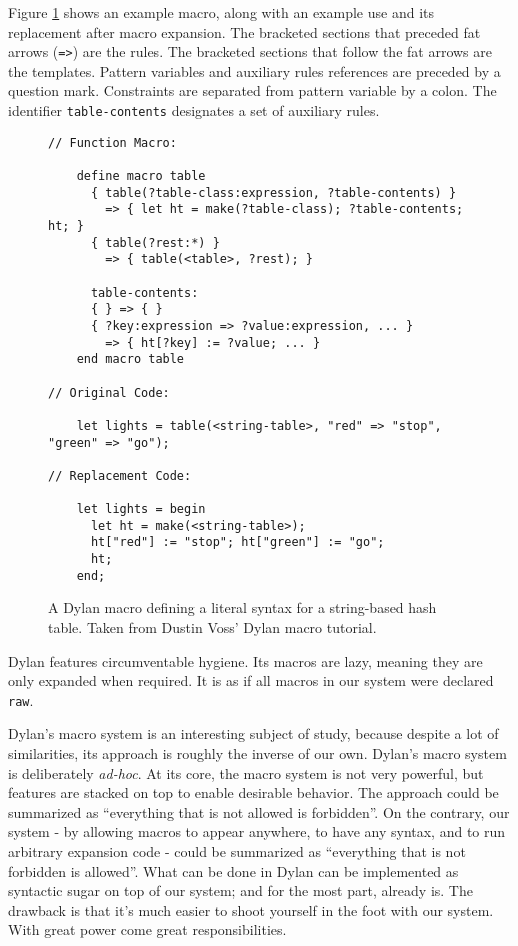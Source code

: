 Figure \ref{dylan_example} shows an example macro, along with an example use and
its replacement after macro expansion. The bracketed sections that preceded fat
arrows (\texttt{=>}) are the rules. The bracketed sections that follow the fat
arrows are the templates. Pattern variables and auxiliary rules references are
preceded by a question mark. Constraints are separated from pattern variable by
a colon. The identifier \texttt{table-contents} designates a set of auxiliary
rules.

\begin{figure}
\small
\begin{lstlisting}[frame=single]
// Function Macro:

    define macro table
      { table(?table-class:expression, ?table-contents) }
        => { let ht = make(?table-class); ?table-contents; ht; }
      { table(?rest:*) }
        => { table(<table>, ?rest); }

      table-contents:
      { } => { }
      { ?key:expression => ?value:expression, ... }
        => { ht[?key] := ?value; ... }
    end macro table

// Original Code:

    let lights = table(<string-table>, "red" => "stop", "green" => "go");

// Replacement Code:

    let lights = begin
      let ht = make(<string-table>);
      ht["red"] := "stop"; ht["green"] := "go";
      ht;
    end;
\end{lstlisting}
\caption{A Dylan macro defining a literal syntax for a string-based hash
  table. Taken from Dustin Voss' Dylan macro tutorial. \cite{dylan_macros}}
\label{dylan_example}
\end{figure}

Dylan features circumventable hygiene. Its macros are lazy, meaning they are
only expanded when required. It is as if all macros in our system were declared
\texttt{raw}.

Dylan's macro system is an interesting subject of study, because despite a lot
of similarities, its approach is roughly the inverse of our own. Dylan's macro
system is deliberately \emph{ad-hoc}. At its core, the macro system is not very
powerful, but features are stacked on top to enable desirable behavior. The
approach could be summarized as ``everything that is not allowed is
forbidden''. On the contrary, our system - by allowing macros to appear
anywhere, to have any syntax, and to run arbitrary expansion code - could be
summarized as ``everything that is not forbidden is allowed''. What can be done
in Dylan can be implemented as syntactic sugar on top of our system; and for the
most part, already is. The drawback is that it's much easier to shoot yourself
in the foot with our system. With great power come great responsibilities.

